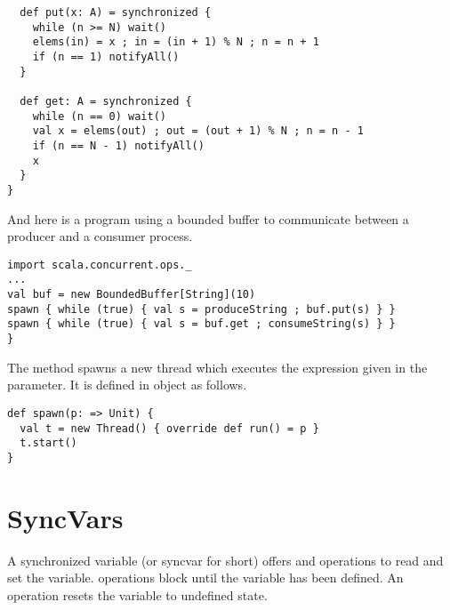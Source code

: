 {\begin{lstlisting}
  def put(x: A) = synchronized {
    while (n >= N) wait()
    elems(in) = x ; in = (in + 1) % N ; n = n + 1
    if (n == 1) notifyAll()
  }

  def get: A = synchronized {
    while (n == 0) wait()
    val x = elems(out) ; out = (out + 1) % N ; n = n - 1
    if (n == N - 1) notifyAll()
    x
  }
}
\end{lstlisting}
And here is a program using a bounded buffer to communicate between a
producer and a consumer process.
\begin{lstlisting}
import scala.concurrent.ops._
...
val buf = new BoundedBuffer[String](10)
spawn { while (true) { val s = produceString ; buf.put(s) } }
spawn { while (true) { val s = buf.get ; consumeString(s) } }
}
\end{lstlisting}
The  method spawns a new thread which executes the
expression given in the parameter. It is defined in object 
as follows.
\begin{lstlisting}
def spawn(p: => Unit) {
  val t = new Thread() { override def run() = p }
  t.start()
}
\end{lstlisting}


\section{SyncVars}

A synchronized variable (or syncvar for short) offers  and
 operations to read and set the variable.  operations
block until the variable has been defined. An  operation
resets the variable to undefined state.

}
